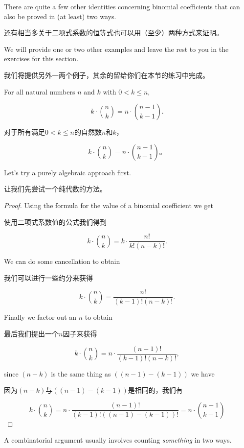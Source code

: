 There are quite a few other identities concerning binomial coefficients
that can also be proved in (at least) two ways.

还有相当多关于二项式系数的恒等式也可以用（至少）两种方式来证明。

We will provide one
or two 
other examples and leave the rest to you in the exercises for this section.

我们将提供另外一两个例子，其余的留给你们在本节的练习中完成。

\begin{thm}
For all natural numbers $n$ and $k$ with $0 < k \leq n$,

\[ k \cdot \binom{n}{k} = n \cdot \binom{n-1}{k-1}. \]
\end{thm}

\begin{thm}
对于所有满足$0 < k \leq n$的自然数$n$和$k$，

\[ k \cdot \binom{n}{k} = n \cdot \binom{n-1}{k-1}。\]
\end{thm}

Let's try a purely algebraic approach first.

让我们先尝试一个纯代数的方法。

\begin{proof}

Using the formula for the value of a binomial coefficient 
we get 

使用二项式系数值的公式我们得到

\[ k \cdot \binom{n}{k} = k \cdot \frac{n!}{k! (n-k)!}. \]

We can do some cancellation to obtain

我们可以进行一些约分来获得

\[ k \cdot \binom{n}{k} = \frac{n!}{(k-1)! (n-k)!}. \]

Finally we factor-out an $n$ to obtain

最后我们提出一个$n$因子来获得

\[ k \cdot \binom{n}{k} = n \cdot \frac{(n-1)!}{(k-1)! (n-k)!}, \]

\noindent since $(n-k)$ is the same thing as $((n-1)-(k-1))$ we have

\noindent 因为$(n-k)$与$((n-1)-(k-1))$是相同的，我们有

\[ k \cdot \binom{n}{k} = n \cdot \frac{(n-1)!}{(k-1)!((n-1)-(k-1))!} 
= n \cdot \binom{n-1}{k-1} \]

\end{proof}

A combinatorial argument usually involves counting \emph{something} 
in two ways.

